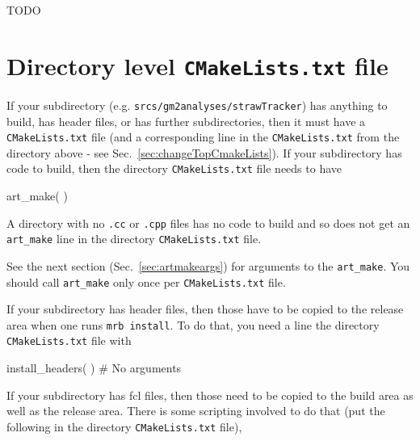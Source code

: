 TODO

\section{Directory level \texttt{CMakeLists.txt} file}
\label{sec:dircmake}

If your subdirectory (e.g. \texttt{srcs/gm2analyses/strawTracker}) has
anything to build, has header files, or has further subdirectories,
then it must have a \texttt{CMakeLists.txt} file (and a corresponding
 line in the \texttt{CMakeLists.txt} from
the directory above - see
Sec.~\ref{sec:changeTopCmakeLists}). If your
subdirectory has code to build, then the directory
\texttt{CMakeLists.txt} file needs to have 

\begin{cpplisting}
 art_make(  )
\end{cpplisting}

A directory with no \texttt{.cc} or \texttt{.cpp} files has no code to
build and so does not get an \texttt{art\_make} line in the directory
\texttt{CMakeLists.txt} file.

See the next section (Sec.~\ref{sec:artmakeargs}) for arguments to the
\texttt{art\_make}. You should call \texttt{art\_make} only once per \texttt{CMakeLists.txt} file. 

If your subdirectory has header files, then those have to be copied to the release area when one runs \texttt{mrb install}. To do that, you need a line the directory \texttt{CMakeLists.txt} file with

\begin{cpplisting}
 install_headers( )  # No arguments 
\end{cpplisting}

If your subdirectory has fcl files, then those need to be copied to
the build area as well as the release area. There is some scripting
involved to do that (put the following in the directory \texttt{CMakeLists.txt} file),

{\small
{}
}

